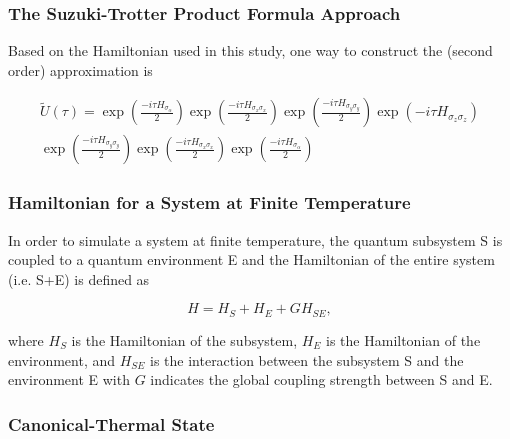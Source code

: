 \documentclass{beamer}
\begin{document}
\begin{frame}
	\frametitle{The Suzuki-Trotter Product Formula Approach}
	Based on the Hamiltonian used in this study, one way to construct the (second order) approximation is 
	
	\begin{equation*}
	\label{tilde_U}
	\begin{split}
	\tilde{U}(\tau) = \exp(\frac{-i\tau H_{\sigma_\alpha}}{2})\exp(\frac{-i\tau H_{\sigma_x \sigma_x}}{2})\exp(\frac{-i\tau H_{\sigma_y \sigma_y}}{2})\exp(-i\tau H_{\sigma_z \sigma_z})\\\exp(\frac{-i\tau H_{\sigma_y \sigma_y}}{2})\exp(\frac{-i\tau H_{\sigma_x \sigma_x}}{2})\exp(\frac{-i\tau H_{\sigma_\alpha}}{2})
	\end{split}
	\end{equation*}

\end{frame}







\begin{frame}
	\frametitle{Hamiltonian for a System at Finite Temperature}
	In order to simulate a system at finite temperature, the quantum subsystem S is coupled to a quantum environment E and the Hamiltonian of the entire system (i.e. S+E) is defined as
	
	\begin{equation*}
	H = H_S + H_E + GH_{SE},
	\end{equation*} 
	
	where $H_S$ is the Hamiltonian of the subsystem, $H_E$ is the Hamiltonian of the environment, and $H_{SE}$ is the interaction between the subsystem S and the environment E with $G$ indicates the global coupling strength between S and E. 
\end{frame}

\begin{frame}
	\frametitle{Canonical-Thermal State}
\end{frame}
\end{document}
